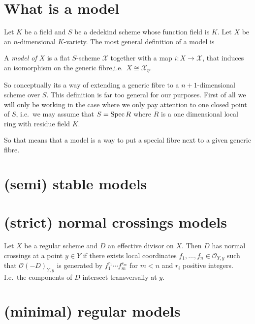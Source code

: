 \section{What is a model} \label{sec:what_is_a_model}

Let $K$ be a field and $S$ be a dedekind scheme whose function field is $K$. 
Let $X$ be an $n$-dimensional $K$-variety. 
The most general definition of a model is 
\begin{definition}
	A \emph{model of $X$} is a flat $S$-scheme $\mathscr X$ together with a map $i: X \to \mathscr X$, that induces an isomorphism on the generic fibre,i.e.\ $X \cong \mathscr X_\eta$.  
\end{definition}
So conceptually its a way of extending a generic fibre to a $n+1$-dimensional scheme over $S$. 
This definition is far too general for our purposes. First of all we will only be working in the case where we only pay attention to one closed point of $S$, i.e.\ we may assume that $S = \operatorname{Spec} R$ where $R$ is a one dimensional local ring with residue field $K$.  

So that means that a model is a way to put a special fibre next to a given generic fibre. 


\section{(semi) stable models} \label{sec:(semi)_stable_models}

\section{(strict) normal crossings models} \label{sec:(strict)_normal_crossings_models}
\begin{definition}
	Let $X$ be a regular scheme and $D$ an effective divisor on $X$. 
	Then $D$ has normal crossings at a point $y \in Y$ if there exists local coordinates $f_1, \ldots, f_n \in \mathcal{O}_{Y, y}$ such that $\mathcal{O}(-D)_{Y, y}$ is generated by $f_1^{r_1} \cdots f_m^{r_m}$ for $m < n$ and $r_i$ positive integers. 
	I.e.\ the components of $D$ intersect transversally at $y$. 
\end{definition}

\section{(minimal) regular models} \label{sec:(minimal)_regular_models}

